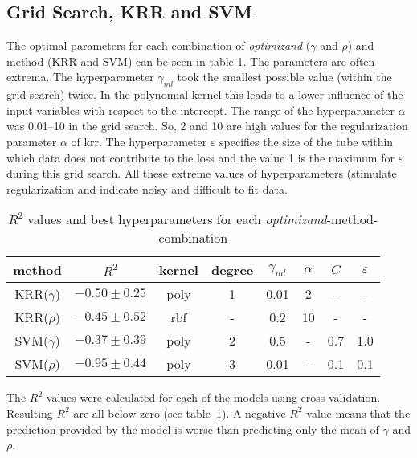 %


\subsection{Grid Search, KRR and SVM}
The optimal parameters for each combination of 
\textit{optimizand} ($\gamma$ and $\rho$) and method (KRR and SVM) 
can be seen in table \ref{tab:grid-search}. 
The parameters are often extrema.
The hyperparameter $\gamma_{ml}$ took the smallest possible value (within the grid search) twice. 
In the polynomial kernel this leads to a lower influence of the input variables with respect to the intercept. 
The range of the hyperparameter $\alpha$ was 0.01--10 in the grid search. 
So, 2 and 10 are high values for the regularization parameter $\alpha$ of \gls{krr}.
The hyperparameter $\varepsilon$ specifies the size of the tube within which data does not contribute to the loss 
and the value 1 is the maximum for $\varepsilon$ during this grid search. 
All these extreme values of hyperparameters (stimulate regularization and indicate noisy and difficult to fit data.
\begin{table}
    \center
    \begin{tabular}{cccccccc}
        \hline\hline
        method  &$R^2$   &kernel &degree &$\gamma_{ml}$   &$\alpha$    &$C$    &$\varepsilon$\\
        \hline
        KRR($\gamma$) & $-0.50 \pm 0.25$  &poly   &1  &0.01   &2 &-&-\\
        KRR($\rho  $) & $-0.45 \pm 0.52$  &rbf    &-   &0.2   &10&-&-\\
        SVM($\gamma$) & $-0.37 \pm 0.39$  &poly   &2  &0.5    &-&0.7  &1.0  \\
        SVM($\rho  $) & $-0.95 \pm 0.44$  &poly   &3  &0.01   &-&0.1  &0.1  \\
        \hline\hline
    \end{tabular}
    \caption{$R^2$ values and best hyperparameters for each \textit{optimizand}-method-combination}
    \label{tab:grid-search}
\end{table}
The $R^2$ values were calculated for each of the models using cross validation. 
Resulting $R^2$ are all below zero (see table~\ref{tab:grid-search}). 
A negative $R^2$ value means that the prediction provided by the model is worse than predicting only the mean of $\gamma$ and $\rho$. 

